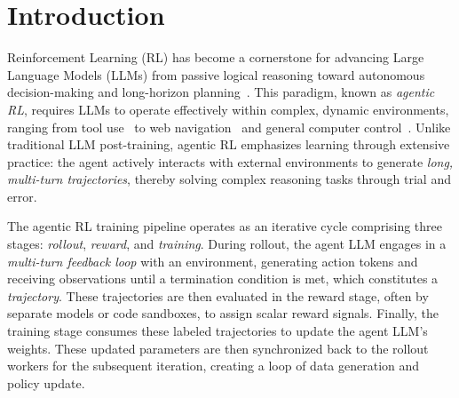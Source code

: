 \section{Introduction}
\label{sec:introduction}

Reinforcement Learning (RL) has become a cornerstone for advancing Large
Language Models (LLMs) from passive logical reasoning toward autonomous
decision-making and long-horizon planning~\cite
{deepseekr1,seed-thinking,openaio4}. This paradigm, known as \emph{agentic RL},
requires LLMs to operate effectively within complex, dynamic environments,
ranging from tool use~\cite
{hao2025exploringsuperiorfunctioncalls,wu2025agenticreasoningstreamlinedframework}
to web navigation~\cite
{song2025r1searcherincentivizingsearchcapability,jin2025searchr1trainingllmsreason,jiang2025deepretrievalhackingrealsearch}
and general computer control~\cite
{luo2025guir1generalistr1style,lu2025uir1enhancingefficientaction,liu2025infigui}.
Unlike traditional LLM post-training, agentic RL emphasizes learning through
extensive practice: the agent actively interacts with external environments
to generate \emph{long, multi-turn trajectories}, thereby solving complex reasoning
tasks through trial and error.


The agentic RL training pipeline operates as an iterative cycle comprising
three stages: \emph{rollout}, \emph{reward}, and \emph{training}. During rollout, the agent LLM engages
in a \emph{multi-turn feedback loop} with an environment, generating action tokens
and receiving observations until a termination condition is met, which 
constitutes a \emph{trajectory}. These trajectories
are then evaluated in the reward stage, often by separate models or code sandboxes, to assign scalar
reward signals. Finally, the training stage consumes these labeled
trajectories to update the agent LLM's weights. These updated parameters are then
synchronized back to the rollout workers for the subsequent iteration,
creating a loop of data generation and policy update.



